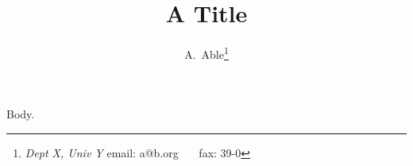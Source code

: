 \documentclass{article}
\begin{document}
\title{A Title}
\author{{A.~Able}\footnote{
{\it Dept X, Univ Y}
email: a@b.org~~~
fax: 39-0}
\phantom{agga}}
\maketitle
Body.
\end{document}
